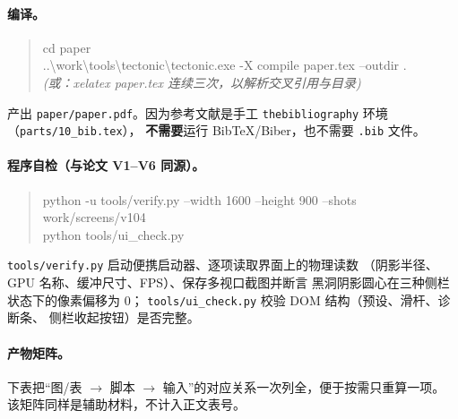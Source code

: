\paragraph{编译。}
\begin{quote}\ttfamily\small
cd paper\\
..\textbackslash work\textbackslash tools\textbackslash tectonic\textbackslash tectonic.exe -X compile paper.tex --outdir .\\
\emph{(或：xelatex paper.tex 连续三次，以解析交叉引用与目录)}
\end{quote}

\noindent 产出 \texttt{paper/paper.pdf}。因为参考文献是手工
\texttt{thebibliography} 环境（\texttt{parts/10\_bib.tex}），
\textbf{不需要}运行 BibTeX/Biber，也不需要 \texttt{.bib} 文件。

\paragraph{程序自检（与论文 V1--V6 同源）。}
\begin{quote}\ttfamily\small
python -u tools/verify.py --width 1600 --height 900 --shots work/screens/v104\\
python tools/ui\_check.py
\end{quote}

\noindent \texttt{tools/verify.py} 启动便携启动器、逐项读取界面上的物理读数
（阴影半径、GPU 名称、缓冲尺寸、FPS）、保存多视口截图并断言
黑洞阴影圆心在三种侧栏状态下的像素偏移为 $0$；
\texttt{tools/ui\_check.py} 校验 DOM 结构（预设、滑杆、诊断条、
侧栏收起按钮）是否完整。

\paragraph{产物矩阵。}
下表把“图/表 $\to$ 脚本 $\to$ 输入”的对应关系一次列全，便于按需只重算一项。
该矩阵同样是辅助材料，不计入正文表号。

